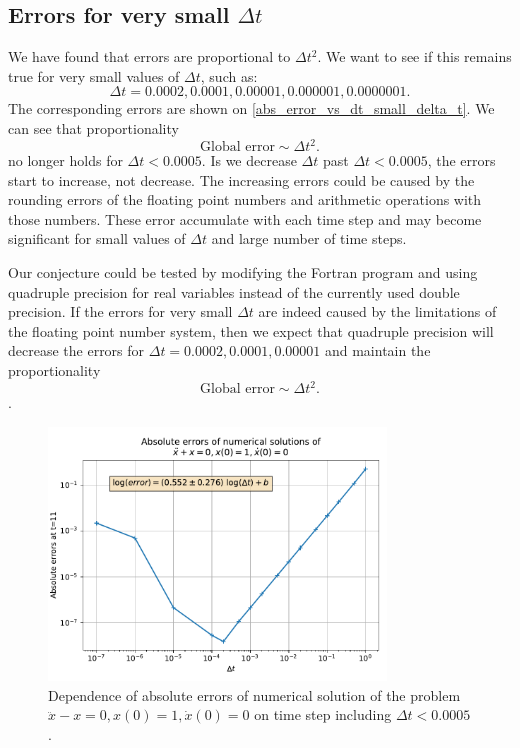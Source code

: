 \subsection{Errors for very small $\Delta t$}

We have found that errors are proportional to $\Delta t^2$. We want to see if this remains true for very small values of $\Delta t$, such as:
\[
  \Delta t = 0.0002, 0.0001, 0.00001, 0.000001, 0.0000001.
\]
The corresponding errors are shown on \autoref{abs_error_vs_dt_small_delta_t}. We can see that proportionality
\[
  \textrm{Global error} \sim \Delta t^2.
\]
no longer holds for $\Delta t < 0.0005$. Is we decrease $\Delta t$ past $\Delta t < 0.0005$, the errors start to increase, not decrease. The increasing errors could be caused by the rounding errors of the floating point numbers and arithmetic operations with those numbers. These error accumulate with each time step and may become significant for small values of $\Delta t$ and large number of time steps.

Our conjecture could be tested by modifying the Fortran program and using quadruple precision for real variables instead of the currently used double precision. If the errors for very small $\Delta t$ are indeed caused by the limitations of the floating point number system, then we expect that quadruple precision will decrease the errors for $\Delta t = 0.0002, 0.0001, 0.00001$ and maintain the proportionality
\[
  \textrm{Global error} \sim \Delta t^2.
\].
\begin{figure}[H]
  \centering
  \includegraphics[width=0.8\textwidth]{figures/abs_error_vs_dt_small_delta_t.pdf}
  \caption{Dependence of absolute errors of numerical solution of the problem $\ddot{x} - x = 0, x(0)=1, \dot{x}(0)=0$ on time step including $\Delta t < 0.0005$.}
  \label{abs_error_vs_dt_small_delta_t}
\end{figure}



